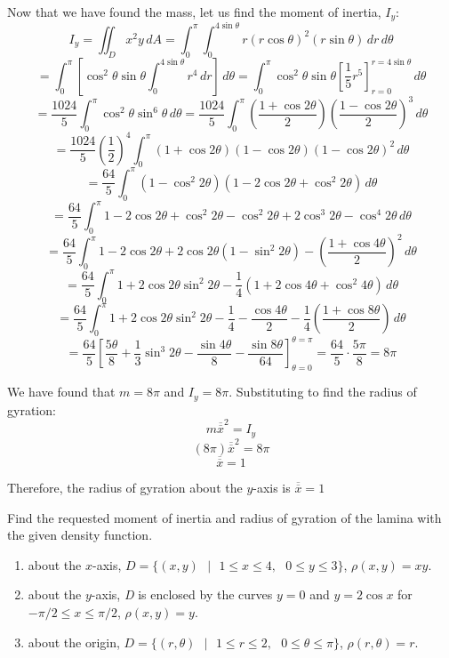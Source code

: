 \begin{Worked}
\begin{Solution}
Now that we have found the mass, let us find the moment of inertia, $I_y$:
$$I_y = \iint_{\textit{D}} x^2 y\,dA = \int_0^{\pi} \int_0^{4\sin{\theta}} r 
\left(r \cos{\theta} \right)^2 \left(r \sin{\theta} \right)\,dr\,d\theta$$
$$= \int_0^{\pi} \left[ \cos^2{\theta} \sin{\theta} \int_0^{4\sin{\theta}} r^4 
\,dr \right]\,d\theta = \int_0^{\pi} \cos^2{\theta} \sin{\theta} \left[\frac{1
}{5}r^5 \right]_{r = 0}^{r = 4\sin{\theta}}\,d\theta$$
$$= \frac{1024}{5} \int_0^{\pi} \cos^2{\theta} \sin^6{\theta}\,d\theta = \frac{
1024}{5} \int_0^{\pi} \left( \frac{1 + \cos{2\theta}}{2} \right) \left( \frac{1
 - \cos{2\theta}}{2} \right)^3\,d\theta$$
$$= \frac{1024}{5} \left(\frac{1}{2} \right)^4 \int_0^{\pi} \left(1 + \cos{2
\theta} \right) \left( 1 - \cos{2\theta} \right) \left(1 - \cos{2\theta} 
\right)^2\,d\theta$$
$$= \frac{64}{5} \int_0^{\pi} \left(1 - \cos^2{2\theta} \right) \left(1 - 2
\cos{2\theta} + \cos^2{2\theta} \right)\,d\theta$$
$$= \frac{64}{5} \int_0^{\pi} 1 - 2\cos{2\theta} + \cos^2{2\theta} - \cos^2{2
\theta} + 2\cos^3{2\theta} - \cos^4{2\theta} \,d\theta$$
$$= \frac{64}{5} \int_0^{\pi} 1 - 2\cos{2\theta} + 2\cos{2\theta} \left(1 - 
\sin^2{2\theta} \right) - \left( \frac{1 + \cos{4\theta}}{2} \right)^2\,d
\theta$$
$$= \frac{64}{5} \int_0^{\pi} 1 + 2\cos{2\theta}\sin^2{2\theta} - \frac{1}{4} 
\left(1 + 2\cos{4\theta} + \cos^2{4\theta} \right)\,d\theta$$
$$= \frac{64}{5} \int_0^{\pi} 1 + 2\cos{2\theta}\sin^2{2\theta} - \frac{1}{4} 
- \frac{\cos{4\theta}}{2} - \frac{1}{4}\left( \frac{1 + \cos{8\theta}}{2} 
\right)\,d\theta$$
$$= \frac{64}{5} \left[\frac{5\theta}{8} + \frac{1}{3}\sin^3{2\theta} - \frac{
\sin{4\theta}}{8} - \frac{\sin{8\theta}}{64} \right]_{\theta = 0}^{\theta = \pi
} = \frac{64}{5} \cdot \frac{5\pi}{8} = 8\pi$$

We have found that $m = 8\pi$ and $I_y = 8\pi$. Substituting to find the radius
of gyration:
$$m\overline{\overline{x}}^2 = I_y$$
$$(8\pi)\overline{\overline{x}}^2 = 8\pi$$
$$\overline{\overline{x}} = 1$$

Therefore, the radius of gyration about the $y$-axis is $\overline{\overline{x}
} = 1$
\end{Solution}
\end{Worked}

\begin{Exercise}[title = {Moments of Inertia and Radii of Gyration}, label = 
moment]
Find the requested moment of inertia and radius of gyration of the lamina with 
the given density function. 
\begin{enumerate}
\item about the $x$-axis, $\textit{D} = \{(x, y)\text{ }|\text{ } 1 \leq x \leq
4,\text{ } 0 \leq y \leq 3\}$, $\rho(x, y) = xy$.
\item about the $y$-axis, \textit{D} is enclosed by the curves $y = 0$ and $y =
2\cos{x}$ for $-\pi/2 \leq x \leq \pi/2$, $\rho(x, y) = y$.
\item about the origin, $\textit{D} = \{(r, \theta)\text{ }|\text{ }1 \leq r 
\leq 2, \text{ }0 \leq \theta \leq \pi\}$, $\rho(r, \theta) = r$. 
\end{enumerate}
\vspace{100mm}
\end{Exercise}

